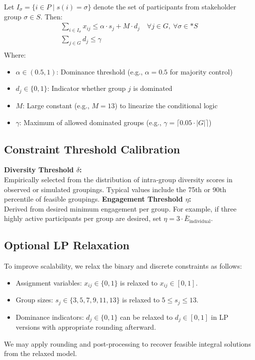 Let \(I_\sigma = \{i \in P \mid s(i) = \sigma\}\) denote the set of participants from stakeholder group \(\sigma \in S\).
Then:
\begin{gather*}
    \sum_{i \in I_\sigma} x_{ij} \leq \alpha \cdot s_j + M \cdot d_j \quad \forall j \in G,\ \forall \sigma \in* S\\
    \sum_{j \in G} d_j \leq \gamma\\
\end{gather*}
\vspace{-0.5cm}
Where:
\begin{itemize}
    \item \(\alpha \in (0.5, 1)\): Dominance threshold (e.g., \(\alpha = 0.5\) for majority control)
    \item \(d_j \in \{0,1\}\): Indicator whether group \(j\) is dominated
    \item \(M\): Large constant (e.g., \(M = 13\)) to linearize the conditional logic
    \item \(\gamma\): Maximum of allowed dominated groups (e.g., \(\gamma = \lceil 0.05 \cdot |G| \rceil\))
\end{itemize}
\noindent
\subsection*{Constraint Threshold Calibration}
\textbf{Diversity Threshold \(\delta\):}\\[3pt]
Empirically selected from the distribution of intra-group diversity scores in observed or simulated groupings.
Typical values include the 75th or 90th percentile of feasible groupings.
\noindent
\textbf{Engagement Threshold \(\eta\):}\\[3pt]
Derived from desired minimum engagement per group.
For example, if three highly active participants per group are desired,
set \(\eta = 3 \cdot \bar{E}_{\text{individual}}\).

\subsection*{Optional LP Relaxation}

To improve scalability, we relax the binary and discrete constraints as follows:
\begin{itemize}
    \item Assignment variables: \quad $x_{ij} \in \{0,1\}$ is relaxed to $x_{ij} \in [0,1]$.
    \item Group sizes: \quad $s_j \in \{3,5,7,9,11,13\}$ is relaxed to $5 \leq s_j \leq 13$.
    \item Dominance indicators: \quad $d_j \in \{0,1\}$ can be relaxed to $d_j \in [0,1]$ in LP versions with appropriate rounding afterward.
\end{itemize}
We may apply rounding and post-processing to recover feasible integral solutions from the relaxed model.
